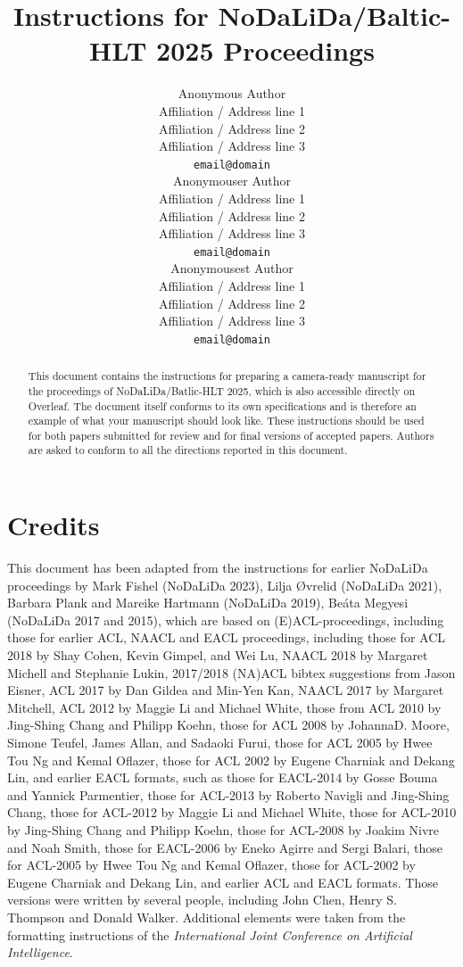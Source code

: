 \documentclass[11pt]{article}
\title{Instructions for NoDaLiDa/Baltic-HLT 2025 Proceedings}
\author{Anonymous Author \\
  Affiliation / Address line 1 \\
  Affiliation / Address line 2 \\
  Affiliation / Address line 3 \\
  {\tt email@domain} \\\And
  Anonymouser Author \\
  Affiliation / Address line 1 \\
  Affiliation / Address line 2 \\
  Affiliation / Address line 3 \\
  {\tt email@domain} \\\And
  Anonymousest Author \\
  Affiliation / Address line 1 \\
  Affiliation / Address line 2 \\
  Affiliation / Address line 3 \\
  {\tt email@domain} \\}
\date{}
\begin{document}
\maketitle
\begin{abstract}
  This document contains the instructions for preparing a camera-ready
  manuscript for the proceedings of NoDaLiDa/Batlic-HLT 2025, which is also 
  accessible directly on Overleaf. The document itself
  conforms to its own specifications and is therefore an example of
  what your manuscript should look like. These instructions should be
  used for both papers submitted for review and for final versions of
  accepted papers.  Authors are asked to conform to all the directions
  reported in this document.
\end{abstract}



\section{Credits}

This document has been adapted from the instructions for earlier
NoDaLiDa proceedings by Mark Fishel (NoDaLiDa 2023), Lilja Øvrelid (NoDaLiDa 2021), Barbara Plank and Mareike Hartmann (NoDaLiDa 2019), Be\'{a}ta Megyesi (NoDaLiDa 2017 and 2015), which are
based on (E)ACL-proceedings, including those for earlier ACL, NAACL and EACL proceedings,
including 
those for ACL 2018 by Shay Cohen, Kevin Gimpel, and Wei Lu, 
NAACL 2018 by Margaret Michell and Stephanie Lukin,
2017/2018 (NA)ACL bibtex suggestions from Jason Eisner,
ACL 2017 by Dan Gildea and Min-Yen Kan, 
NAACL 2017 by Margaret Mitchell, 
ACL 2012 by Maggie Li and Michael White, 
those from ACL 2010 by Jing-Shing Chang and Philipp Koehn, 
those for ACL 2008 by JohannaD. Moore, Simone Teufel, James Allan, and Sadaoki Furui, 
those for ACL 2005 by Hwee Tou Ng and Kemal Oflazer, 
those for ACL 2002 by Eugene Charniak and Dekang Lin, 
and earlier EACL formats, such as those for
EACL-2014 by Gosse Bouma
and Yannick Parmentier, those for ACL-2013 by Roberto Navigli
and Jing-Shing Chang, those for ACL-2012 by Maggie Li and Michael
White, those for ACL-2010 by Jing-Shing Chang and Philipp Koehn,
those for ACL-2008 by Joakim Nivre and Noah Smith, 
those for EACL-2006 by Eneko Agirre and Sergi Balari, 
those for ACL-2005 by Hwee Tou Ng and Kemal Oflazer, those for
ACL-2002 by Eugene Charniak and Dekang Lin, and earlier ACL and EACL
formats. Those versions were written by several people, including John
Chen, Henry S. Thompson and Donald Walker. Additional elements were
taken from the formatting instructions of the {\em International Joint
  Conference on Artificial Intelligence}.
\end{document}
